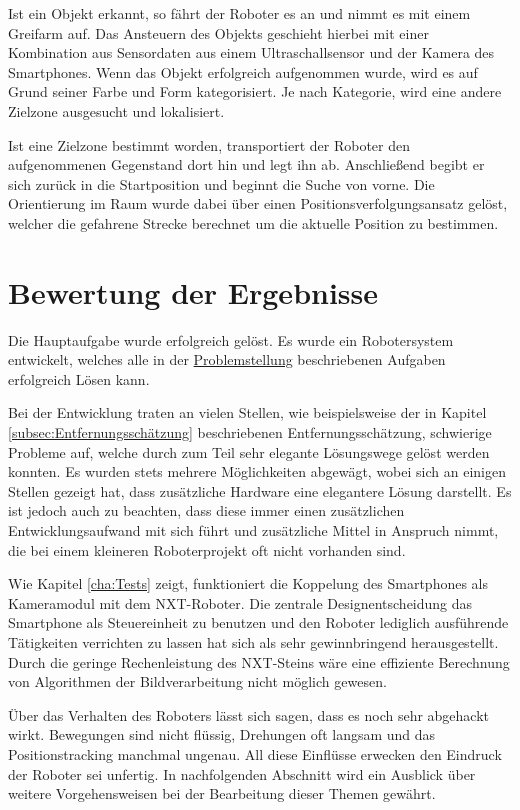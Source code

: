 Ist ein Objekt erkannt, so fährt der Roboter es an und nimmt es mit einem Greifarm auf. Das Ansteuern des Objekts geschieht hierbei mit einer Kombination aus Sensordaten aus einem Ultraschallsensor und der Kamera des Smartphones. Wenn das Objekt erfolgreich aufgenommen wurde, wird es auf Grund seiner Farbe und Form kategorisiert. Je nach Kategorie, wird eine andere Zielzone ausgesucht und lokalisiert.

Ist eine Zielzone bestimmt worden, transportiert der Roboter den aufgenommenen Gegenstand dort hin und legt ihn ab. Anschließend begibt er sich zurück in die Startposition und beginnt die Suche von vorne. Die Orientierung im Raum wurde dabei über einen Positionsverfolgungsansatz gelöst, welcher die gefahrene Strecke berechnet um die aktuelle Position zu bestimmen.

\section{Bewertung der Ergebnisse}

Die Hauptaufgabe wurde erfolgreich gelöst. Es wurde ein Robotersystem entwickelt, welches alle in der \hyperref[cha:Problemstellung]{Problemstellung} beschriebenen Aufgaben erfolgreich Lösen kann. 

Bei der Entwicklung traten an vielen Stellen, wie beispielsweise der in Kapitel \ref{subsec:Entfernungsschätzung} beschriebenen Entfernungsschätzung, schwierige Probleme auf, welche durch zum Teil sehr elegante Lösungswege gelöst werden konnten. Es wurden stets mehrere Möglichkeiten abgewägt, wobei sich an einigen Stellen gezeigt hat, dass zusätzliche Hardware eine elegantere Lösung darstellt. Es ist jedoch auch zu beachten, dass diese immer einen zusätzlichen Entwicklungsaufwand mit sich führt und zusätzliche Mittel in Anspruch nimmt, die bei einem kleineren Roboterprojekt oft nicht vorhanden sind. 

Wie Kapitel \ref{cha:Tests} zeigt, funktioniert die Koppelung des Smartphones als Kameramodul mit dem NXT-Roboter. Die zentrale Designentscheidung das Smartphone als Steuereinheit zu benutzen und den Roboter lediglich ausführende Tätigkeiten verrichten zu lassen hat sich als sehr gewinnbringend herausgestellt. Durch die geringe Rechenleistung des NXT-Steins wäre eine effiziente Berechnung von Algorithmen der Bildverarbeitung nicht möglich gewesen.

Über das Verhalten des Roboters lässt sich sagen, dass es noch sehr abgehackt wirkt. Bewegungen sind nicht flüssig, Drehungen oft langsam und das Positionstracking manchmal ungenau. All diese Einflüsse erwecken den Eindruck der Roboter sei unfertig. In nachfolgenden Abschnitt wird ein Ausblick über weitere Vorgehensweisen bei der Bearbeitung dieser Themen gewährt.

